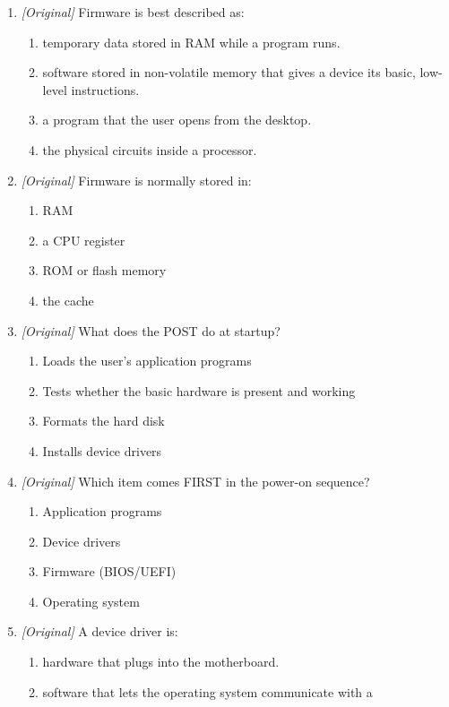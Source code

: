 \documentclass[11pt]{article}
\begin{document}
\begin{enumerate}[label=\textbf{Q\arabic*.}, leftmargin=*]
\begin{enumerate}[label=\Alph*.]
  \end{enumerate}
\item \textit{[Original]} Firmware is best described as:
  \begin{enumerate}[label=\Alph*.]
    \item temporary data stored in RAM while a program runs.
    \item software stored in non-volatile memory that gives a device its
      basic, low-level instructions.
    \item a program that the user opens from the desktop.
    \item the physical circuits inside a processor.
  \end{enumerate}
\item \textit{[Original]} Firmware is normally stored in:
  \begin{enumerate}[label=\Alph*.]
    \item RAM
    \item a CPU register
    \item ROM or flash memory
    \item the cache
  \end{enumerate}
\item \textit{[Original]} What does the POST do at startup?
  \begin{enumerate}[label=\Alph*.]
    \item Loads the user's application programs
    \item Tests whether the basic hardware is present and working
    \item Formats the hard disk
    \item Installs device drivers
  \end{enumerate}
\item \textit{[Original]} Which item comes FIRST in the power-on sequence?
  \begin{enumerate}[label=\Alph*.]
    \item Application programs
    \item Device drivers
    \item Firmware (BIOS/UEFI)
    \item Operating system
  \end{enumerate}
\item \textit{[Original]} A device driver is:
  \begin{enumerate}[label=\Alph*.]
    \item hardware that plugs into the motherboard.
    \item software that lets the operating system communicate with a

\end{enumerate}
\end{enumerate}
\end{document}
